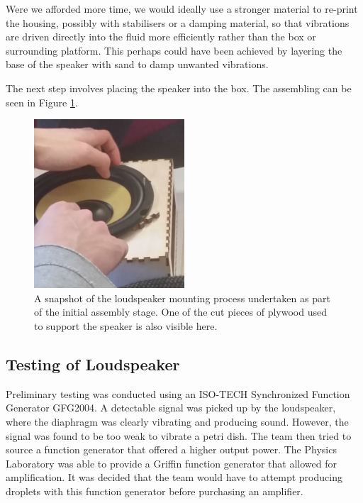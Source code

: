 Were we afforded more time, we would ideally use a stronger material to  re-print the housing, possibly with stabilisers or a damping material, so that vibrations are driven directly into the fluid more efficiently rather than the box or surrounding platform. This perhaps could have been achieved by layering the base of the speaker with sand to damp unwanted vibrations.

The next step involves placing the speaker into the box. The assembling can be seen in Figure \ref{fig:boxassembly}.

\begin{figure}[ht]
\centering
\includegraphics[width=0.5\textwidth]{prototype/exp_rep_imgs/boxAssembly.jpg}
\caption{A snapshot of the loudspeaker mounting process undertaken as part of the initial assembly stage. One of the cut pieces of plywood used to support the speaker is also visible here.}
\label{fig:boxassembly}
\end{figure}


\subsection{Testing of Loudspeaker}
Preliminary testing was conducted using an ISO-TECH Synchronized Function Generator GFG2004. A detectable signal was picked up by the loudspeaker, where the diaphragm was clearly vibrating and producing sound. However, the signal was found to be too weak to vibrate a petri dish. The team then tried to source a function generator that offered a higher output power. The Physics Laboratory was able to provide a Griffin function generator that allowed for amplification. It was decided that the team would have to attempt producing droplets with this function generator before purchasing an amplifier.

